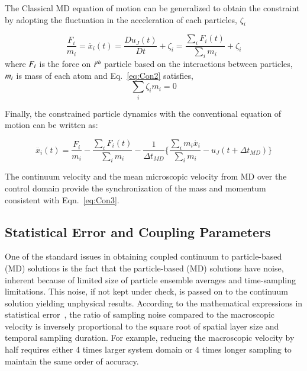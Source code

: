 \documentclass[preprint,12pt]{elsarticle}
\begin{document}
The Classical MD equation of motion can be generalized to obtain the constraint by adopting the fluctuation in the acceleration of each particles, $\zeta_{i}$

\vspace{-.2em}
\begin{equation}
 \frac{F_{i}}{m_{i}} = \ddot{x_{i}}(t)  =   \frac{Du_{J}(t)}{Dt} + \zeta_{i} = \frac{\displaystyle\sum_{i}F_{i}(t)} {\displaystyle\sum_{i}m_{i}} +   \zeta_{i}
 \label{eq:Con2}
\end{equation}
\normalsize
where $\it F_{i}$ is the force on $\it i^{th}$ particle based on the interactions between particles,  $\it m_{i}$ is mass of each atom and  Eq.~\ref{eq:Con2} satisfies,
\vspace{-.2em}
\begin{equation}
\displaystyle\sum_{i}\zeta_{i}m_{i} = 0
 \label{eq:Con2}
\end{equation}
\normalsize


Finally, the constrained particle dynamics with the conventional equation of motion can be written as:


\vspace{-.2em}
\begin{equation}
 \ddot{x_{i}}(t) = \frac{F_{i}}{m_{i}} -  \frac{\displaystyle\sum_{i}F_{i}(t)} {\displaystyle\sum_{i}m_{i}} - \frac{1}{\Delta t_{MD}} \{  \frac{\displaystyle\sum_{i}m_{i}\dot{x_{i}}} {\displaystyle\sum_{i}m_{i}} - u_{J}(t + \Delta t_{MD})\}
 \label{eq:Con3}
\end{equation}
\normalsize


The continuum velocity and the mean microscopic velocity from MD over the control domain provide the synchronization of the mass and momentum consistent with Eqn.~\ref{eq:Con3}.



\subsection{Statistical Error and Coupling Parameters}
\label{sec:numerical_noise}

One of the standard issues in obtaining coupled continuum to particle-based (MD) solutions is the fact that the particle-based (MD) solutions have noise, inherent because of limited size of particle ensemble averages and time-sampling limitations. This noise, if not kept under check, is passed on to the continuum solution yielding unphysical results. According to the mathematical expressions in statistical error~\cite{Hadjicon3,Time_Mechanism}, the ratio of sampling noise compared to the macroscopic velocity is inversely proportional to the square root of spatial layer size and temporal sampling duration. For example, reducing the macroscopic velocity by half requires either 4 times larger system domain or 4 times longer sampling to maintain the same order of accuracy. 
\end{document}
